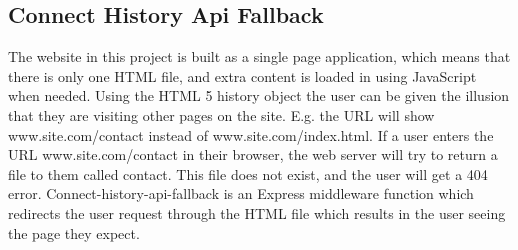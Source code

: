 \subsection{Connect History Api Fallback}
The website in this project is built as a single page application, which means that there is only one HTML file, and extra content is loaded in using JavaScript when needed. Using the HTML 5 history object\cite{HTML5HistoryObject:Info} the user can be given the illusion that they are visiting other pages on the site. E.g. the URL will show www.site.com/contact instead of www.site.com/index.html. If a user enters the URL www.site.com/contact in their browser, the web server will try to return a file to them called contact. This file does not exist, and the user will get a 404 error. Connect-history-api-fallback\cite{CHAF:Info} is an Express middleware function which redirects the user request through the HTML file which results in the user seeing the page they expect.